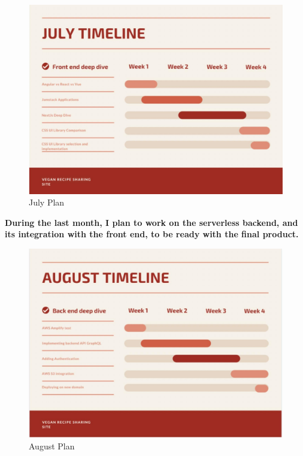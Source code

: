 \begin{figure}[!hb]
\centering
\caption[July Plan]{July Plan}%
\label{fig:july}
\includegraphics[width=\linewidth,height=\textheight,keepaspectratio]{img/july}
\end{figure}

\clearpage

\textbf{During the last month, I plan to work on the serverless backend, and its integration with the front end, 
to be ready with the final product.}

\begin{figure}[!hb]
\centering
\caption[August Plan]{August Plan}%
\label{fig:august}
\includegraphics[width=\linewidth,height=\textheight,keepaspectratio]{img/august}
\end{figure}

